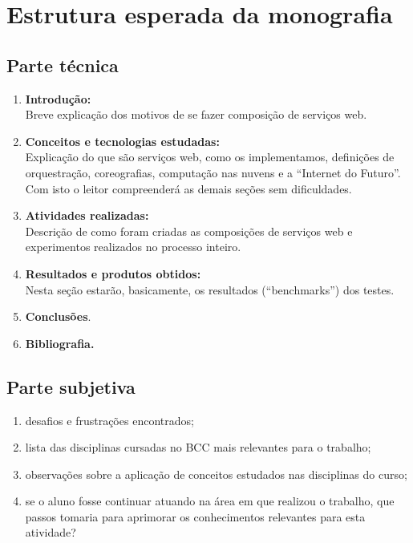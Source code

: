 \documentclass[11pt,a4paper]{article}
\begin{document}
\section{Estrutura esperada da monografia}
\subsection{Parte técnica}
\begin{enumerate}
\item \textbf{Introdução:}  \\ Breve explicação dos motivos de se fazer composição de serviços web.
\item \textbf{Conceitos e tecnologias estudadas:}  \\ Explicação do que são serviços web, como os implementamos, definições de orquestração, coreografias, computação nas nuvens e a ``Internet do Futuro''. Com isto o leitor compreenderá as demais seções sem dificuldades.
\item \textbf{Atividades realizadas:}  \\ Descrição de como foram criadas as composições de serviços web e experimentos realizados no processo inteiro.
\item \textbf{Resultados e produtos obtidos:}  \\ Nesta seção estarão, basicamente, os resultados (``benchmarks'') dos testes.
\item \textbf{Conclusões}. 
\item \textbf{Bibliografia.} 
\end{enumerate}


\subsection{Parte subjetiva}
\begin{enumerate}
\item desafios e frustrações encontrados;
\item lista das disciplinas cursadas no BCC mais relevantes para o trabalho;
\item observações sobre a aplicação de conceitos estudados nas disciplinas do curso;
\item se o aluno fosse continuar atuando na área em que realizou o trabalho, que passos tomaria para aprimorar os conhecimentos relevantes para esta atividade?
\end {enumerate}
\end{document}
